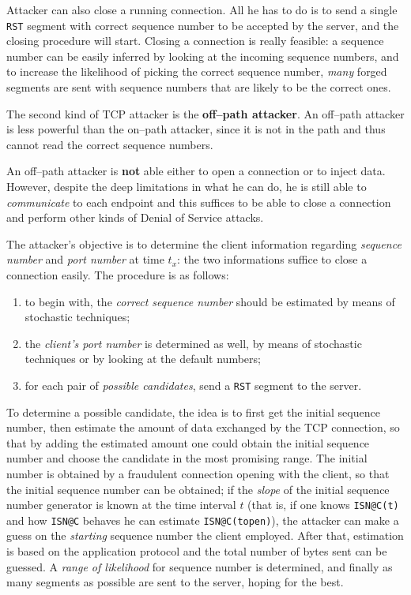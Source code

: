 \documentclass[10pt]{extbook}
\begin{document}
Attacker can also close a running connection. All he has to do is to send a
single \texttt{RST} segment with correct sequence number to be accepted by the
server, and the closing procedure will start. Closing a connection is really
feasible: a sequence number can be easily inferred by looking at the incoming
sequence numbers, and to increase the likelihood of picking the correct
sequence number, \emph{many} forged segments are sent with sequence numbers
that are likely to be the correct ones.

The second kind of TCP attacker is the \textbf{off--path attacker}. An
off--path attacker is less powerful than the on--path attacker, since it is not
in the path and thus cannot read the correct sequence numbers.

An off--path attacker is \textbf{not} able either to open a connection or to
inject data. However, despite the deep limitations in what he can do, he is
still able to \emph{communicate} to each endpoint and this suffices to be able
to close a connection and perform other kinds of Denial of Service attacks.

The attacker's objective is to determine the client information regarding \emph{sequence number} and \emph{port number} at time $t_x$: the two informations suffice to close a connection easily. The procedure is as follows:
\begin{enumerate}
    \item to begin with, the \emph{correct sequence number} should be estimated by
        means of stochastic techniques;
    \item the \emph{client's port number} is determined as well, by means of
        stochastic techniques or by looking at the default numbers;
    \item for each pair of \emph{possible candidates}, send a \texttt{RST} segment to
        the server.
\end{enumerate}

To determine a possible candidate, the idea is to first get the initial
sequence number, then estimate the amount of data exchanged by the TCP
connection, so that by adding the estimated amount one could obtain the initial
sequence number and choose the candidate in the most promising range. The
initial number is obtained by a fraudulent connection opening with the client,
so that the initial sequence number can be obtained; if the \emph{slope} of the
initial sequence number generator is known at the time interval $t$ (that is,
if one knows \texttt{ISN@C(t)} and how \texttt{ISN@C} behaves he can estimate
\texttt{ISN@C(topen)}), the attacker can make a guess on the \emph{starting}
sequence number the client employed. After that, estimation is based on the
application protocol and the total number of bytes sent can be guessed. A
\emph{range of likelihood} for sequence number is determined, and finally as
many segments as possible are sent to the server, hoping for the best.
\end{document}
